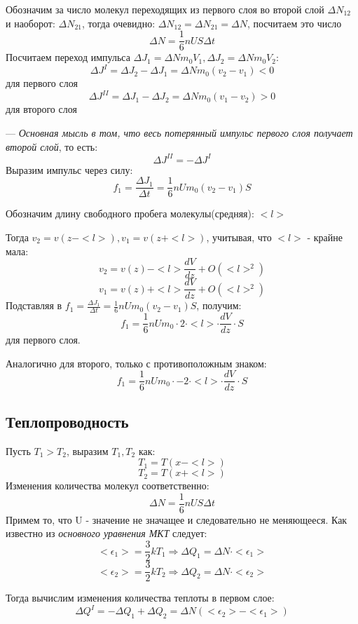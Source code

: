 \documentclass[../main.tex]{subfiles}
\begin{document}
\vspace{5px}

Обозначим за число молекул переходящих из первого слоя во второй слой $\Delta N_{12}$ и наоборот: $\Delta N_{21}$, тогда очевидно: $\Delta N_{12} = \Delta N_{21} = \Delta N$, посчитаем это число
\[\Delta N = \frac{1}{6} n U S \Delta t\]
Посчитаем переход импульса $\Delta J_1 = \Delta N m_0V_1 , \Delta J_2 = \Delta N m_0V_2$:
\[\Delta J^{I} = \Delta J_2 - \Delta J_1 = \Delta N m_0(v_2 - v_1) < 0\]
для первого слоя
\newpage
\[\Delta J^{II} = \Delta J_1 - \Delta J_2 = \Delta N m_0(v_1 - v_2) > 0\]
для второго слоя

\vspace{5px}

--- \textit{Основная мысль в том, что  весь потерянный импульс первого слоя получает второй слой}, то есть:
\[\Delta J^{II} = -\Delta J^{I}\]
Выразим импульс через силу:
\[f_1 = \frac{\Delta J_1}{\Delta t} = \frac{1}{6}nUm_0(v_2 - v_1)S\]

Обозначим длину свободного пробега молекулы(средняя): $<l>$

\vspace{5px}

Тогда $v_2 = v(z - <l>), v_1 = v(z + <l>)$, учитывая, что $<l>$ - крайне мала:
\[v_2 = v(z) - <l>\frac{dV}{dz} + O(<l>^2)\]
\[v_1 = v(z) + <l>\frac{dV}{dz} + O(<l>^2)\]
Подставляя в $f_1 = \frac{\Delta J_1}{\Delta t} = \frac{1}{6}nUm_0(v_2 - v_1)S$, получим:
\[f_1 = \frac{1}{6}nUm_0 \cdot 2 \cdot <l> \cdot \frac{dV}{dz} \cdot S\]
для первого слоя.

\vspace{5px}

Аналогично для второго, только с противоположным знаком:
\[f_1 = \frac{1}{6}nUm_0 \cdot -2 \cdot <l> \cdot \frac{dV}{dz} \cdot S\]

\subsection{Теплопроводность}
Пусть $T_1 > T_2$, выразим $T_1, T_2$ как:
\[T_1 = T(x - <l>)\]
\[T_2 = T(x+<l>)\]
Изменения количества молекул соответственно:
\[\Delta N = \frac{1}{6}nUS\Delta t\]
Примем то, что U - значение не значащее и следовательно не меняющееся. Как известно из \textit{основного уравнения МКТ} следует:
\[<\epsilon_1> = \frac{3}{2}kT_1 \Rightarrow \Delta Q_1 = \Delta N \cdot <\epsilon_1>\]
\[<\epsilon_2> = \frac{3}{2}kT_2 \Rightarrow \Delta Q_2 = \Delta N \cdot <\epsilon_2>\]

Тогда вычислим изменения количества теплоты в первом слое:
\[ \Delta Q ^{I} = -\Delta Q_1 + \Delta Q_2 = \Delta N(<\epsilon_2> - <\epsilon_1>)\]
\end{document}
